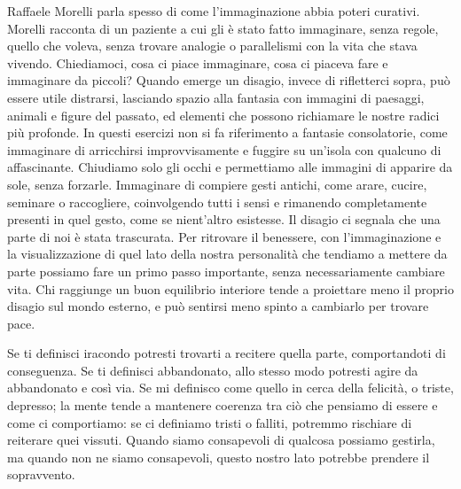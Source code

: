 \documentclass[12pt]{book} %
\begin{document}
Raffaele Morelli parla spesso di come l'immaginazione abbia poteri curativi. Morelli racconta di un
paziente a cui gli è stato fatto immaginare, senza regole, quello che voleva, senza trovare analogie o parallelismi con
la vita che stava vivendo. Chiediamoci, cosa ci piace immaginare, cosa ci piaceva fare e immaginare da piccoli?
Quando emerge un disagio, invece di rifletterci sopra, può essere utile distrarsi, lasciando spazio alla fantasia con immagini di paesaggi, animali e figure del passato, ed elementi che possono richiamare le nostre radici più profonde. In questi esercizi non si fa riferimento a fantasie consolatorie, come immaginare di arricchirsi improvvisamente e fuggire su un’isola con qualcuno di affascinante. Chiudiamo solo gli occhi e permettiamo alle immagini di apparire da sole, senza forzarle. Immaginare di compiere gesti antichi, come arare, cucire, seminare o raccogliere, coinvolgendo tutti i sensi e rimanendo completamente presenti in quel gesto, come se nient’altro esistesse.
Il disagio ci segnala che una parte di noi è stata trascurata. Per ritrovare il benessere, con l'immaginazione e la visualizzazione di quel lato della nostra personalità che tendiamo a mettere da parte possiamo fare un primo passo importante, senza necessariamente cambiare vita. Chi raggiunge un buon equilibrio interiore tende a proiettare meno il proprio disagio sul mondo esterno, e può sentirsi meno spinto a cambiarlo per trovare pace.

Se ti definisci iracondo potresti trovarti a recitere quella parte, comportandoti di conseguenza. Se ti definisci abbandonato, allo stesso modo potresti agire da abbandonato e così via. 
Se mi definisco come quello in cerca della felicità, o triste, depresso; la mente tende a mantenere coerenza tra ciò che pensiamo di essere e come ci comportiamo: se ci definiamo tristi o falliti, potremmo rischiare di reiterare quei vissuti.
Quando siamo consapevoli di qualcosa possiamo gestirla, ma quando non ne siamo consapevoli, questo nostro lato potrebbe prendere il sopravvento.
\end{document}

